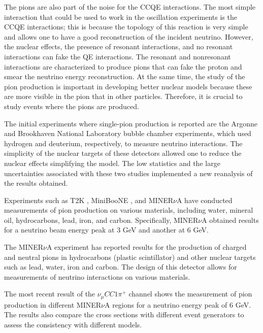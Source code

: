 The pions are also part of the noise for the CCQE interactions. The most simple interaction that could be used to work in the oscillation experiments is the CCQE interactions; this is because the topology of this reaction is very simple and allows one to have a good reconstruction of the incident neutrino. However, the nuclear effects, the presence of resonant interactions, and no resonant interactions can fake the QE interactions. The resonant and nonresonant interactions are characterized to produce pions that can fake the proton and smear the neutrino energy reconstruction. At the same time, the study of the pion production is important in developing better nuclear models because these are more visible in the pion that in other particles. Therefore, it is crucial to study events where the pions are produced. 

The initial experiments where single-pion production is reported are the Argonne \cite{PhysRevD.25.1161} and Brookhaven \cite{PhysRevD.34.2554} National Laboratory bubble chamber experiments, which used hydrogen and deuterium, respectively, to measure neutrino interactions. The simplicity of the nuclear targets of these detectors allowed one to reduce the nuclear effects simplifying the model. The low statistics and the large uncertainties associated with these two studies implemented a new reanalysis of the results obtained\cite{PhysRevD.90.112017}.

Experiments such as T2K \cite{PhysRevD.95.012010}, MiniBooNE \cite{Aguilar_Arevalo_2011}, and MINER$\nu$A \cite{Eberly:2014mra, Bercellie.131.011801, PhysRevD.94.052005} have conducted measurements of pion production on various materials, including water, mineral oil, hydrocarbons, lead, iron, and carbon. Specifically, MINER$\nu$A obtained results for a neutrino beam energy peak at 3 GeV and another at 6 GeV.

The MINER$\nu$A experiment has reported results for the production of charged \cite{Bercellie.131.011801, Eberly:2014mra, PhysRevD.94.052005} and neutral \cite{PhysRevD.96.072003, Le_2015} pions in hydrocarbons (plastic scintillator) and other nuclear targets such as lead, water, iron and carbon. The design of this detector allows for measurements of neutrino interactions on various materials.

The most recent result of the $\nu_\mu CC1\pi^+$ channel \cite{Bercellie.131.011801} shows the measurement of pion production in different MINER$\nu$A regions for a neutrino energy peak of 6 GeV. The results also compare the cross sections with different event generators to assess the consistency with different models.

